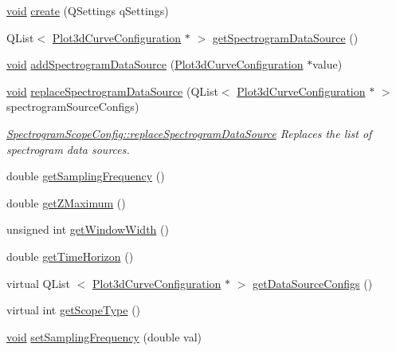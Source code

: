 \begin{DoxyCompactItemize}
\hyperlink{group___u_a_v_objects_plugin_ga444cf2ff3f0ecbe028adce838d373f5c}{void} \hyperlink{group___scope_plugin_ga764cb2be26dd64d438f6ff61da3f1c92}{create} (\-Q\-Settings q\-Settings)
\item 
\-Q\-List$<$ \hyperlink{struct_plot3d_curve_configuration}{\-Plot3d\-Curve\-Configuration} $\ast$ $>$ \hyperlink{group___scope_plugin_ga0f006cce4d464191ee21a19fad8c8ee1}{get\-Spectrogram\-Data\-Source} ()
\item 
\hyperlink{group___u_a_v_objects_plugin_ga444cf2ff3f0ecbe028adce838d373f5c}{void} \hyperlink{group___scope_plugin_ga7c459607813f5554b33051a7a8bc0e24}{add\-Spectrogram\-Data\-Source} (\hyperlink{struct_plot3d_curve_configuration}{\-Plot3d\-Curve\-Configuration} $\ast$value)
\item 
\hyperlink{group___u_a_v_objects_plugin_ga444cf2ff3f0ecbe028adce838d373f5c}{void} \hyperlink{group___scope_plugin_ga3202b61b6cde085652ea649879e48c63}{replace\-Spectrogram\-Data\-Source} (\-Q\-List$<$ \hyperlink{struct_plot3d_curve_configuration}{\-Plot3d\-Curve\-Configuration} $\ast$ $>$ spectrogram\-Source\-Configs)
\begin{DoxyCompactList}\small\item\em \hyperlink{group___scope_plugin_ga3202b61b6cde085652ea649879e48c63}{\-Spectrogram\-Scope\-Config\-::replace\-Spectrogram\-Data\-Source} \-Replaces the list of spectrogram data sources. \end{DoxyCompactList}\item 
double \hyperlink{group___scope_plugin_ga4fb9d3be277337c045b46845bab20f39}{get\-Sampling\-Frequency} ()
\item 
double \hyperlink{group___scope_plugin_ga953b8cd98a71026b132ddace51d3111a}{get\-Z\-Maximum} ()
\item 
unsigned int \hyperlink{group___scope_plugin_ga38591d941f9fabb469887d48006a629c}{get\-Window\-Width} ()
\item 
double \hyperlink{group___scope_plugin_gabf7ca6406f6b5affaf769e09e633a101}{get\-Time\-Horizon} ()
\item 
virtual \-Q\-List\*
$<$ \hyperlink{struct_plot3d_curve_configuration}{\-Plot3d\-Curve\-Configuration} $\ast$ $>$ \hyperlink{group___scope_plugin_ga20cd38fb6f34eae6a7a5c9e18a2184ba}{get\-Data\-Source\-Configs} ()
\item 
virtual int \hyperlink{group___scope_plugin_gab53e8753102217ba194ab539f0892bd7}{get\-Scope\-Type} ()
\item 
\hyperlink{group___u_a_v_objects_plugin_ga444cf2ff3f0ecbe028adce838d373f5c}{void} \hyperlink{group___scope_plugin_ga3e3207be4ff4a10b7ec3df051d76c3f6}{set\-Sampling\-Frequency} (double val)

\end{DoxyCompactItemize}

